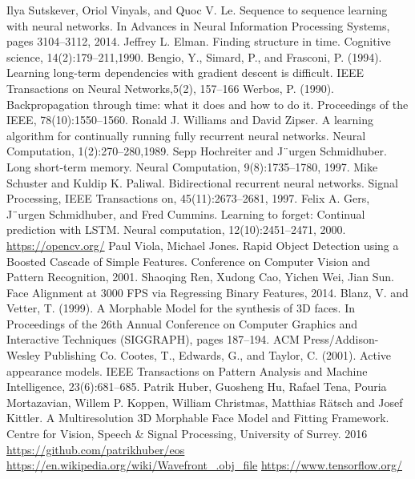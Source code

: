 \documentclass[a4paper, openany, oneside, 11pt]{book}
\begin{document}
\begin{thebibliography}{99}
Ilya Sutskever, Oriol Vinyals, and Quoc V. Le. Sequence to sequence learning
with neural networks. In Advances in Neural Information Processing Systems,
pages 3104–3112, 2014.
Jeffrey L. Elman. Finding structure in time. Cognitive science, 14(2):179–211,1990.
Bengio, Y., Simard, P., and Frasconi, P. (1994). Learning long-term dependencies with gradient descent is
difficult. IEEE Transactions on Neural Networks,5(2), 157–166
Werbos, P. (1990). Backpropagation through time: what it does and how to do it. Proceedings of the
IEEE, 78(10):1550–1560.
Ronald J. Williams and David Zipser. A learning algorithm for continually running fully recurrent neural networks. Neural Computation, 1(2):270–280,1989.
Sepp Hochreiter and J¨urgen Schmidhuber. Long short-term memory. Neural Computation, 9(8):1735–1780, 1997.
Mike Schuster and Kuldip K. Paliwal. Bidirectional recurrent neural networks.
Signal Processing, IEEE Transactions on, 45(11):2673–2681, 1997.
Felix A. Gers, J¨urgen Schmidhuber, and Fred Cummins. Learning to forget:
Continual prediction with LSTM. Neural computation, 12(10):2451–2471,
2000.
\url{https://opencv.org/}
Paul Viola, Michael Jones. Rapid Object Detection using a Boosted Cascade of Simple Features. Conference on Computer Vision and Pattern Recognition, 2001.
Shaoqing Ren, Xudong Cao, Yichen Wei, Jian Sun. Face Alignment at 3000 FPS via Regressing Binary Features, 2014.
Blanz, V. and Vetter, T. (1999). A Morphable Model for the
synthesis of 3D faces. In Proceedings of the 26th Annual Conference on Computer Graphics and Interactive Techniques (SIGGRAPH), pages 187–194. ACM
Press/Addison-Wesley Publishing Co.
Cootes, T., Edwards, G., and Taylor, C. (2001). Active appearance models. IEEE Transactions on Pattern Analysis and Machine Intelligence, 23(6):681–685.
Patrik Huber, Guosheng Hu, Rafael Tena, Pouria Mortazavian, Willem P. Koppen, William Christmas, Matthias R{\"a}tsch and Josef Kittler. A Multiresolution 3D Morphable Face Model and Fitting Framework. Centre for Vision, Speech \& Signal Processing, University of Surrey. 2016
\url{https://github.com/patrikhuber/eos}
\url{https://en.wikipedia.org/wiki/Wavefront_.obj_file}
\url{https://www.tensorflow.org/}
\end{thebibliography}

\newpage
\listoffigures
\listoftables

\newpage
{}
\printglossary[title=Spisak skrac1enica, type=\acronymtype]
\end{document}
